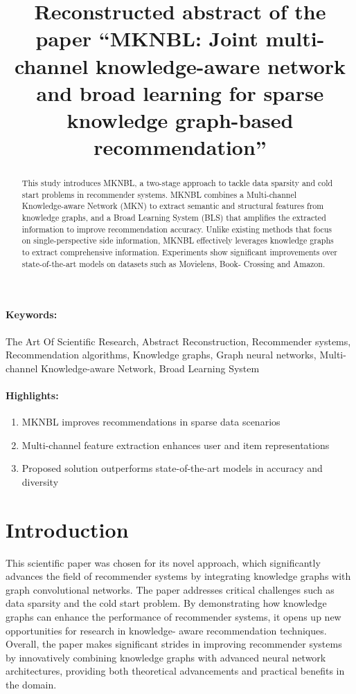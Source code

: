 \documentclass[12pt]{article}
\title{Reconstructed abstract of the paper ``MKNBL: Joint multi-channel knowledge-aware network and broad learning for sparse knowledge graph-based recommendation''}
\date{}
\begin{document}
\maketitle

\begin{abstract}
This study introduces MKNBL, a two-stage approach to tackle data sparsity and cold start problems in 
recommender systems. MKNBL combines a Multi-channel Knowledge-aware Network (MKN) to extract semantic and 
structural features from knowledge graphs, and a Broad Learning System (BLS) that amplifies the extracted 
information to improve recommendation accuracy. Unlike existing methods that focus on single-perspective 
side information, MKNBL effectively leverages knowledge graphs to extract comprehensive information. 
Experiments show significant improvements over state-of-the-art models on datasets such as Movielens, Book-
Crossing and Amazon.
\end{abstract}
\paragraph{Keywords:} The Art Of Scientific Research, Abstract Reconstruction, Recommender systems, 
Recommendation algorithms, Knowledge graphs, Graph neural networks, Multi-channel Knowledge-aware Network, 
Broad Learning System  

\paragraph{Highlights:}
\begin{enumerate}
\item MKNBL improves recommendations in sparse data scenarios
\item Multi-channel feature extraction enhances user and item representations
\item Proposed solution outperforms state-of-the-art models in accuracy and diversity
\end{enumerate}

\section{Introduction}
This scientific paper was chosen for  its novel approach, which significantly advances the field of 
recommender systems by integrating knowledge graphs with graph convolutional networks. The paper addresses 
critical challenges such as data sparsity and the cold start problem. By demonstrating how knowledge graphs 
can enhance the performance of recommender systems, it opens up new opportunities for research in knowledge-
aware recommendation techniques. Overall, the paper makes significant strides in improving recommender 
systems by innovatively combining knowledge graphs with advanced neural network architectures, providing 
both theoretical advancements and practical benefits in the domain.

%
%
\end{document}
